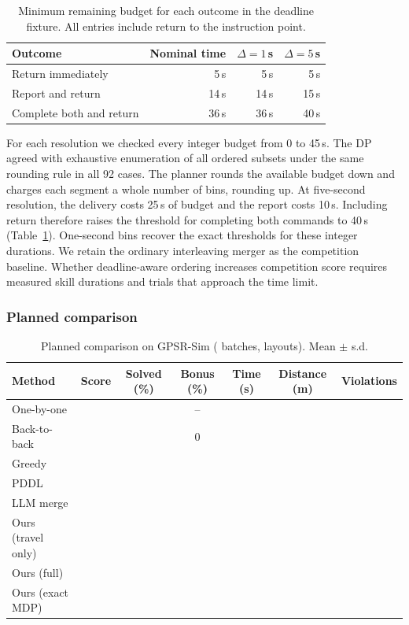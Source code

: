 \documentclass[conference]{IEEEtran}
\newcommand{\X}{}
\newcommand{\X}{\textcolor{red}{XX}}
\begin{document}
\begin{table}[t]
\centering
\caption{Minimum remaining budget for each outcome in the deadline fixture.
All entries include return to the instruction point.}
\label{tab:endgame-budget}
\begin{tabular}{lrrr}
\toprule
Outcome & Nominal time & $\Delta=1$\,s & $\Delta=5$\,s \\
\midrule
Return immediately & 5\,s & 5\,s & 5\,s \\
Report and return & 14\,s & 14\,s & 15\,s \\
Complete both and return & 36\,s & 36\,s & 40\,s \\
\bottomrule
\end{tabular}
\end{table}

For each resolution we checked every integer budget from 0 to 45\,s.
The DP agreed with exhaustive enumeration of all ordered subsets under
the same rounding rule in all 92 cases. The planner rounds the available
budget down and charges each segment a whole number of bins, rounding up.
At five-second resolution, the delivery costs 25\,s of budget and the
report costs 10\,s. Including return therefore raises the threshold for
completing both commands to 40\,s (Table~\ref{tab:endgame-budget}).
One-second bins recover the exact thresholds for these integer durations.
We retain the ordinary interleaving merger as the competition baseline.
Whether deadline-aware ordering increases competition score requires
measured skill durations and trials that approach the time limit.

\subsubsection{Planned comparison}
\begin{table}[t]
\centering
\caption{Planned comparison on GPSR-Sim (\X{} batches, \X{} layouts). Mean $\pm$ s.d.}
\label{tab:main}
\begin{tabular}{lcccccc}
\toprule
Method & Score & Solved (\%) & Bonus (\%) & Time (s) & Distance (m) & Violations \\
\midrule
One-by-one       & \X & \X & --  & \X & \X & \X \\
Back-to-back     & \X & \X & 0   & \X & \X & \X \\
Greedy           & \X & \X & \X  & \X & \X & \X \\
PDDL             & \X & \X & \X  & \X & \X & \X \\
LLM merge        & \X & \X & \X  & \X & \X & \X \\
Ours (travel only) & \X & \X & \X & \X & \X & \X \\
Ours (full)      & \X & \X & \X  & \X & \X & \X \\
Ours (exact MDP) & \X & \X & \X  & \X & \X & \X \\
\bottomrule
\end{tabular}
\end{table}
\end{document}

